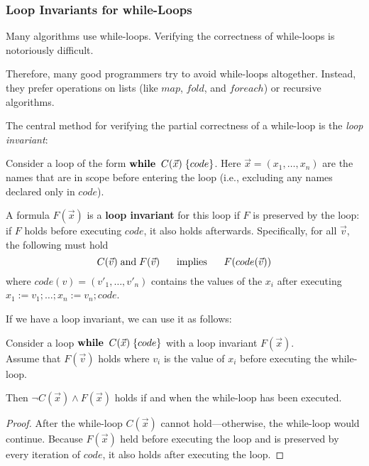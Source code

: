 \subsubsection{Loop Invariants for while-Loops}

Many algorithms use while-loops.
Verifying the correctness of while-loops is notoriously difficult.

Therefore, many good programmers try to avoid while-loops altogether.
Instead, they prefer operations on lists (like $map$, $fold$, and $foreach$) or recursive algorithms.
\medskip

The central method for verifying the partial correctness of a while-loop is the \emph{loop invariant}:

\begin{definition}\label{def:ad:loopinv}
Consider a loop of the form $\awhileI{C(\vec{x})}{code}$.
Here $\vec{x}=(x_1,\ldots,x_n)$ are the names that are in scope before entering the loop (i.e., excluding any names declared only in $code$).

A formula $F(\vec{x})$ is a \textbf{loop invariant} for this loop if $F$ is preserved by the loop: if $F$ holds before executing $code$, it also holds afterwards.
 Specifically, for all $\vec{v}$, the following must hold
   \[C(\vec{v}) \;\mathrm{and}\; F(\vec{v}) \hspace*{.5cm} \;\mathrm{implies}\;\hspace*{.5cm} F(code(\vec{v}))\]
   where $code(v)=(v'_1,\ldots,v'_n)$ contains the values of the $x_i$ after executing $x_1:=v_1; \ldots; x_n:=v_n; code$.
\end{definition}

If we have a loop invariant, we can use it as follows:
\begin{theorem}\label{thm:ad:loopinv}
Consider a loop $\awhileI{C(\vec{x})}{code}$ with a loop invariant $F(\vec{x})$.\\
Assume that $F(\vec{v})$ holds where $v_i$ is the value of $x_i$ before executing the while-loop.
\medskip

Then $\neg C(\vec{x}) \wedge F(\vec{x})$ holds if and when the while-loop has been executed.\footnotemark
\end{theorem}
\begin{proof}
After the while-loop $C(\vec{x})$ cannot hold---otherwise, the while-loop would continue.
Because $F(\vec{x})$ held before executing the loop and is preserved by every iteration of $code$, it also holds after executing the loop.
\end{proof}

